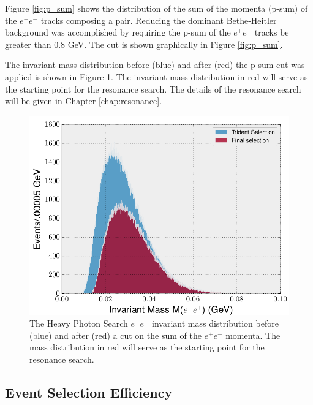 Figure \ref{fig:p_sum} shows the distribution of the sum of the momenta (p-sum) 
of the $e^+e^-$ tracks composing a pair.  Reducing the dominant Bethe-Heitler 
background was accomplished by  requiring the p-sum of 
the $e^+e^-$ tracks be greater than 0.8 GeV. 
The cut is shown graphically in Figure \ref{fig:p_sum}.

The invariant mass
distribution before (blue) and after (red) the p-sum cut was applied is shown
in Figure \ref{fig:mass_selection}.  The invariant mass distribution in red 
will serve as the starting point for the resonance search.
The details of the resonance search will be given in Chapter \ref{chap:resonance}.

\begin{figure}[t]
    \centering
    \includegraphics[width=1.0\textwidth]{images/20160504_invariant_mass_selection.png}
    \caption{The Heavy Photon Search $e^+e^-$ invariant mass distribution before (blue) 
             and after (red) a cut on the sum of the $e^+e^-$ momenta. 
             The mass distribution in red 
             will serve as the starting point for the resonance search.}
    \label{fig:mass_selection}
\end{figure}

\subsection{Event Selection Efficiency}

